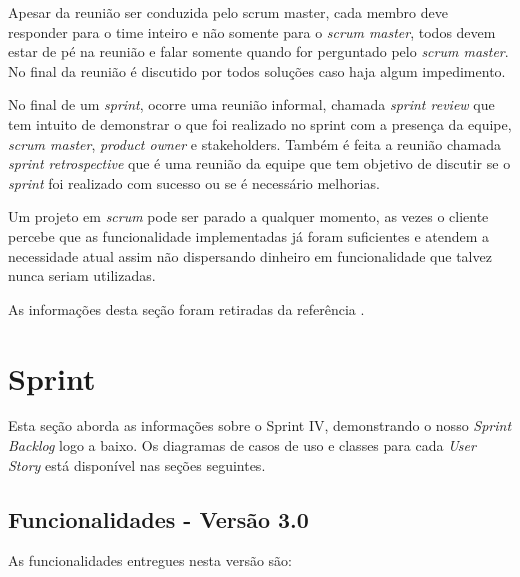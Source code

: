 \documentclass{abnt}
\begin{document}
			Apesar da reunião ser conduzida pelo scrum master, cada membro deve responder para o time inteiro e não somente para o
			\emph{scrum master}, todos devem estar de pé na reunião e falar somente quando for perguntado pelo \emph{scrum master}. No final da
			reunião é discutido por todos soluções caso haja algum impedimento.
			
			No final de um \emph{sprint}, ocorre uma reunião informal, chamada \emph{sprint review} que tem intuito de demonstrar o que foi 
			realizado no sprint com a presença da equipe, \emph{scrum master}, \emph{product owner} e stakeholders. Também é feita a reunião chamada \emph{sprint retrospective}
			que é uma reunião da equipe que tem objetivo de discutir se o \emph{sprint} foi realizado com sucesso ou se é necessário melhorias.
			
			Um projeto em \emph{scrum} pode ser parado a qualquer momento, as vezes o cliente percebe que as funcionalidade implementadas já foram
			suficientes e atendem a necessidade atual assim não dispersando dinheiro em funcionalidade que talvez nunca seriam utilizadas.
			
			As informações desta seção foram retiradas da referência \cite{SCRUMEPF}.
	
		
		

\clearpage

\chapter{Sprint}
	
		Esta seção aborda as informações sobre o Sprint IV, demonstrando o nosso \emph{Sprint Backlog} logo a baixo. Os diagramas de casos de uso e classes para cada \emph{User Story} está disponível nas seções seguintes.
	
			
		\section{Funcionalidades - Versão 3.0}
		
			As funcionalidades entregues nesta versão são:
		
\end{document}
